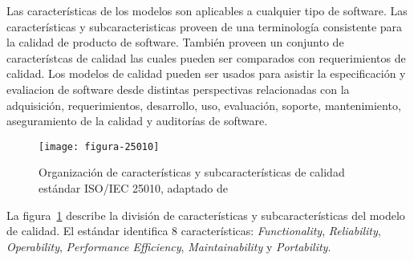Las características de los modelos son aplicables a cualquier tipo de software.
Las características y subcaracteristicas proveen de una terminología consistente
para la calidad de producto de software. También proveen un conjunto de característcas
de calidad las cuales pueden ser comparados con requerimientos de calidad. Los modelos
de calidad pueden ser usados para asistir la especificación y evaliacion de software 
desde distintas perspectivas relacionadas con la adquisición, requerimientos, desarrollo,
uso, evaluación, soporte, mantenimiento, aseguramiento de la calidad y auditorías de
software.

\begin{figure}[h!]	
	\centering
	\texttt{[image: figura-25010]}
	\caption[Organización de características y subcaracterísticas de calidad estándar ISO/IEC 25010]{Organización de características y subcaracterísticas de calidad estándar ISO/IEC 25010, adaptado de \cite{ISO/IEC2011}}
	\label{fig:caracteristicas-25010}
\end{figure}
\bigskip


La figura~\ref{fig:caracteristicas-25010} describe la división de características y subcaracterísticas 
del modelo de calidad. El estándar identifica 8 características: \textit{Functionality}, 
\textit{Reliability}, \textit{Operability}, \textit{Performance Efficiency}, \textit{Maintainability} y \textit{Portability}.

